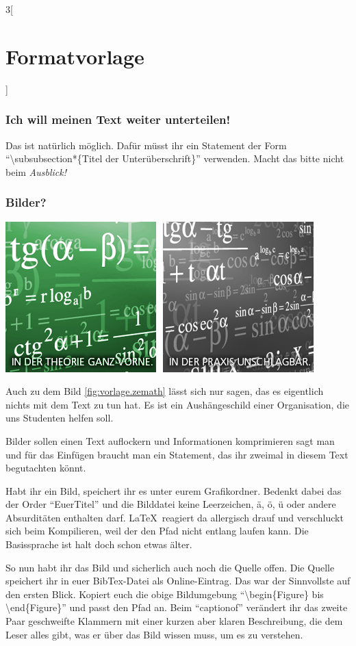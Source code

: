 \begin{multicols}{3}[\section{Formatvorlage}]
\subsubsection*{Ich will meinen Text weiter unterteilen!}
Das ist natürlich möglich. Dafür müsst ihr ein Statement der Form \enquote{\textbackslash subsubsection*\{Titel der Unterüberschrift\}} verwenden. Macht das bitte nicht beim \textit{Ausblick!}

\subsubsection*{Bilder?}
\begin{Figure}
\includegraphics[width=\linewidth]{Kapitel/Vorlage/Grafiken/sg_ft_zemath.png}
\label{fig:vorlage.zemath}
\end{Figure}
Auch zu dem Bild \ref{fig:vorlage.zemath} lässt sich nur sagen, das es eigentlich nichts mit dem Text zu tun hat. Es ist ein Aushängeschild einer Organisation, die uns Studenten helfen soll.

Bilder sollen einen Text auflockern und Informationen komprimieren sagt man und für das Einfügen braucht man ein Statement, das ihr zweimal in diesem Text begutachten könnt. 

Habt ihr ein Bild, speichert ihr es unter eurem Grafikordner. Bedenkt dabei das der Order \enquote{EuerTitel} und die Bilddatei keine Leerzeichen, ä, ö, ü oder andere Absurditäten enthalten darf. \LaTeX~reagiert da allergisch drauf und verschluckt sich beim Kompilieren, weil der den Pfad nicht entlang laufen kann. Die Basissprache ist halt doch schon etwas älter.

So nun habt ihr das Bild und sicherlich auch noch die Quelle offen. Die Quelle speichert ihr in euer BibTex-Datei als Online-Eintrag. Das war der Sinnvollste auf den ersten Blick. Kopiert euch die obige Bildumgebung \enquote{\textbackslash begin\{Figure\} bis \textbackslash end\{Figure\}} und passt den Pfad an. Beim \enquote{captionof} verändert ihr das zweite Paar geschweifte Klammern mit einer kurzen aber klaren Beschreibung, die dem Leser alles gibt, was er über das Bild wissen muss, um es zu verstehen. 


\end{multicols}
